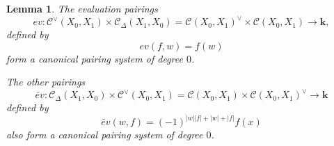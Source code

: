 \documentclass[11pt]{amsproc}
\def\K{{\mathbf{k}}}
\def\cc{\mathcal{C}}
\def\D{\Delta}
\newtheorem{lem}{Lemma}[section]
\theoremstyle{remark}
\numberwithin{equation}{section}
\begin{document}
\begin{lem}\label{lem: evaluation pairing canonical}
The evaluation pairings
\begin{equation}\label{evaluation pairing c}
ev:  \cc^{\vee}(X_{0}, X_{1}) \times  \cc_{\D}(X_{1}, X_{0}) =  \cc(X_{0}, X_{1})^{\vee} \times \cc(X_{0}, X_{1}) \to \K,
\end{equation}
defined by 
\begin{equation}
ev(f, w) = f(w)
\end{equation}
 form a canonical pairing system of degree $0$.

The other pairings
\begin{equation}\label{opp evaluation pairing c}
\tilde{ev}: \cc_{\D}(X_{1}, X_{0}) \times \cc^{\vee}(X_{0}, X_{1}) = \cc(X_{0}, X_{1}) \times \cc(X_{0}, X_{1})^{\vee} \to \K
\end{equation}
defined by 
\begin{equation}
\tilde{ev}(w, f)  = (-1)^{|w||f| + |w| + |f|} f(x)
\end{equation}
also form a canonical pairing system of degree $0$.
\end{lem}
\end{document}
